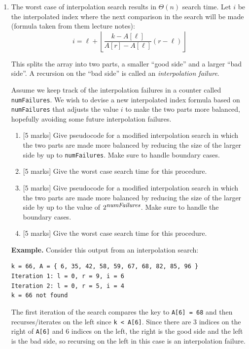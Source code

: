 \documentclass[11pt]{article}
\begin{document}
\begin{enumerate}

\item The worst case of interpolation search results in $\Theta(n)$ search time. 
Let $i$ be the interpolated index where the next comparison in the search will be made (formula taken from them lecture notes): 
\[ i = \ell+\left\lfloor\frac{k-A[\ell]}{A[r]-A[\ell]}(r-\ell)\right\rfloor \]

This splits the array into two parts, a smaller ``good side'' and a larger ``bad side''. 
A recursion on the ``bad side'' is called an \emph{interpolation failure}.

Assume we keep track of the interpolation failures in a counter called {\tt numFailures}. 
We wish to devise a new interpolated index formula based on {\tt numFailures} that adjusts the value $i$ to make the two parts more balanced, hopefully avoiding some future interpolation failures.

\begin{enumerate}
\item {[5 marks]}  Give pseudocode for a modified interpolation search in which the two parts are made more balanced by reducing the size of the larger side by up to {\tt numFailures}.
Make sure to handle boundary cases.
\item {[5 marks]}  Give the worst case search time for this procedure.
\item {[5 marks]}  Give pseudocode for a modified interpolation search in which the two parts are made more balanced by reducing the size of the larger side by up to the value of $2^{\mbox{\small\it numFailures}}$.
Make sure to handle the boundary cases.
\item {[5 marks]} Give the worst case search time for this procedure.
\end{enumerate}

{\bf Example.}
Consider this output from an interpolation search:
\begin{verbatim}
k = 66, A = { 6, 35, 42, 58, 59, 67, 68, 82, 85, 96 }
Iteration 1: l = 0, r = 9, i = 6
Iteration 2: l = 0, r = 5, i = 4
k = 66 not found
\end{verbatim}
The first iteration of the search compares the key to {\tt A[6] = 68} and then recurses/iterates on the left since {\tt k < A[6]}.
Since there are 3 indices on the right of {\tt A[6]} and 6 indices on the left, the right is the good side and the left is the bad side, so recursing on the left in this case is an interpolation failure.


\end{enumerate}
\end{document}
